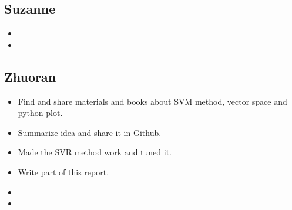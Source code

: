\documentclass{article}
\begin{document}
\subsection{Suzanne}

\begin{itemize}
\item
\item
\end{itemize}

\subsection{Zhuoran}
\begin{itemize}
\item Find and share materials and books about SVM method, vector space and python plot.
\item Summarize idea and share it in Github.
\item Made the SVR method work and tuned it.
\item Write part of this report.
\end{itemize}

\begin{itemize}
\item
\item
\end{itemize}
\end{document}
